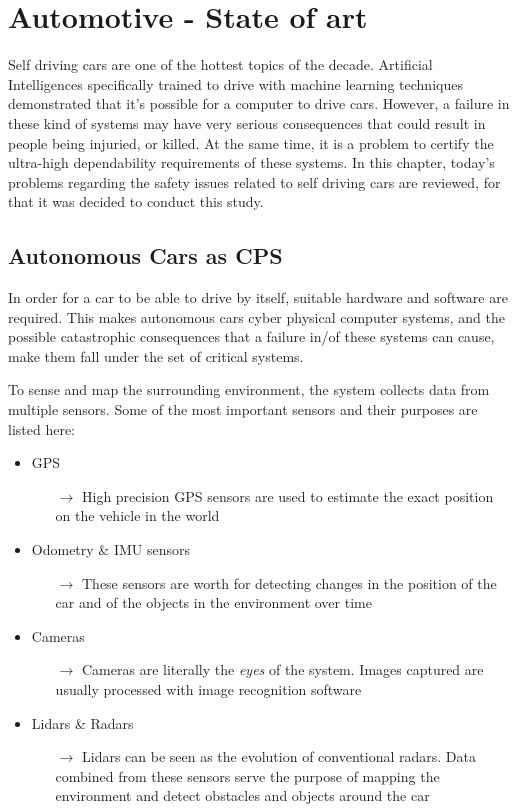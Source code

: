 \chapter{Automotive - State of art}

Self driving cars are one of the hottest topics of the decade. Artificial Intelligences specifically trained to drive with machine learning techniques demonstrated that it's possible for a computer to drive cars. However, a failure in these kind of systems may have very serious consequences that could result in people being injuried, or killed. At the same time, it is a problem to certify the ultra-high dependability requirements of these systems. In this chapter, today's problems regarding the safety issues related to self driving cars are reviewed, for that it was decided to conduct this study.

\section{Autonomous Cars as CPS}

In order for a car to be able to drive by itself, suitable hardware and software are required. This makes autonomous cars cyber physical computer systems, and the possible catastrophic consequences that a failure in/of these systems can cause, make them fall under the set of critical systems.\newline

To sense and map the surrounding environment, the system collects data from multiple sensors. Some of the most important sensors and their purposes are listed here:

\begin{itemize}
	\item GPS
	\begin{itemize}
		\item[$\rightarrow$] High precision GPS sensors are used to estimate the exact position on the vehicle in the world
	\end{itemize}
	\item Odometry \& IMU sensors
	\begin{itemize}
		\item[$\rightarrow$] These sensors are worth for detecting changes in the position of the car and of the objects in the environment over time
	\end{itemize}
	\item Cameras
	\begin{itemize}
		\item[$\rightarrow$] Cameras are literally the \textsl{eyes} of the system. Images captured are usually processed with image recognition software
	\end{itemize}
	\item Lidars \& Radars
	\begin{itemize}
		\item[$\rightarrow$] Lidars can be seen as the evolution of conventional radars. Data combined from these sensors serve the purpose of mapping the environment and detect obstacles and objects around the car
	\end{itemize}
\end{itemize}

